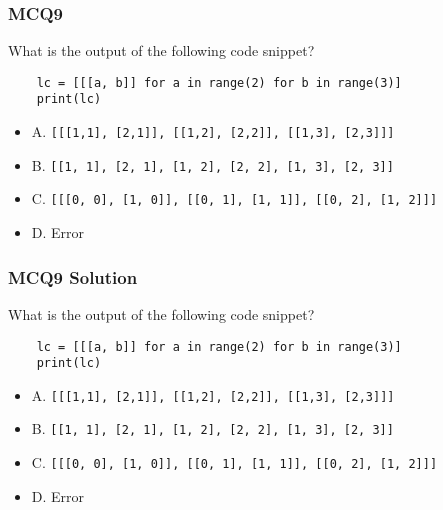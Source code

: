 \documentclass{beamer}
\begin{document}
\begin{frame}[fragile]
    \frametitle{MCQ9}
    What is the output of the following code snippet?
    \begin{verbatim}
    lc = [[[a, b]] for a in range(2) for b in range(3)]
    print(lc)
    \end{verbatim}
    \begin{itemize}
        \small
        \item A. \texttt{[[[1,1], [2,1]], [[1,2], [2,2]], [[1,3], [2,3]]]}
        \item B. \texttt{[[1, 1], [2, 1], [1, 2], [2, 2], [1, 3], [2, 3]]}
        \item C. \texttt{[[[0, 0], [1, 0]], [[0, 1], [1, 1]], [[0, 2], [1, 2]]]}
        \item D. Error
    \end{itemize}
\end{frame}
\begin{frame}[fragile]
    \frametitle{MCQ9 Solution}
    What is the output of the following code snippet?
    \begin{verbatim}
    lc = [[[a, b]] for a in range(2) for b in range(3)]
    print(lc)
    \end{verbatim}
    \begin{itemize}
        \small
        \item A. \texttt{[[[1,1], [2,1]], [[1,2], [2,2]], [[1,3], [2,3]]]}
        \item B. \texttt{[[1, 1], [2, 1], [1, 2], [2, 2], [1, 3], [2, 3]]}
        \item C. \alert{\texttt{[[[0, 0], [1, 0]], [[0, 1], [1, 1]], [[0, 2], [1, 2]]]}}
        \item D. Error
    \end{itemize}
\end{frame}
\end{document}
